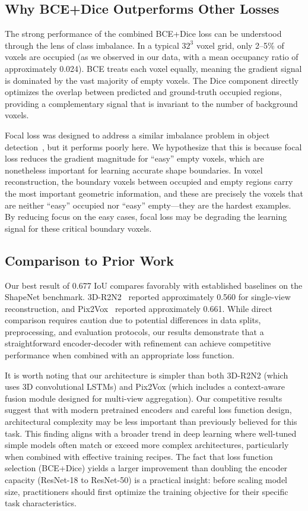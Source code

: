 \documentclass[10pt,twocolumn,letterpaper]{article}
\begin{document}
\subsection{Why BCE+Dice Outperforms Other Losses}

The strong performance of the combined BCE+Dice loss can be understood through the lens of class imbalance. In a typical $32^3$ voxel grid, only 2--5\% of voxels are occupied (as we observed in our data, with a mean occupancy ratio of approximately 0.024). BCE treats each voxel equally, meaning the gradient signal is dominated by the vast majority of empty voxels. The Dice component directly optimizes the overlap between predicted and ground-truth occupied regions, providing a complementary signal that is invariant to the number of background voxels.

Focal loss was designed to address a similar imbalance problem in object detection~\cite{lin2017focal}, but it performs poorly here. We hypothesize that this is because focal loss reduces the gradient magnitude for ``easy'' empty voxels, which are nonetheless important for learning accurate shape boundaries. In voxel reconstruction, the boundary voxels between occupied and empty regions carry the most important geometric information, and these are precisely the voxels that are neither ``easy'' occupied nor ``easy'' empty---they are the hardest examples. By reducing focus on the easy cases, focal loss may be degrading the learning signal for these critical boundary voxels.

\subsection{Comparison to Prior Work}

Our best result of 0.677 IoU compares favorably with established baselines on the ShapeNet benchmark. 3D-R2N2~\cite{choy2016r2n2} reported approximately 0.560 for single-view reconstruction, and Pix2Vox~\cite{xie2019pix2vox} reported approximately 0.661. While direct comparison requires caution due to potential differences in data splits, preprocessing, and evaluation protocols, our results demonstrate that a straightforward encoder-decoder with refinement can achieve competitive performance when combined with an appropriate loss function.

It is worth noting that our architecture is simpler than both 3D-R2N2 (which uses 3D convolutional LSTMs) and Pix2Vox (which includes a context-aware fusion module designed for multi-view aggregation). Our competitive results suggest that with modern pretrained encoders and careful loss function design, architectural complexity may be less important than previously believed for this task. This finding aligns with a broader trend in deep learning where well-tuned simple models often match or exceed more complex architectures, particularly when combined with effective training recipes. The fact that loss function selection (BCE+Dice) yields a larger improvement than doubling the encoder capacity (ResNet-18 to ResNet-50) is a practical insight: before scaling model size, practitioners should first optimize the training objective for their specific task characteristics.
\end{document}
